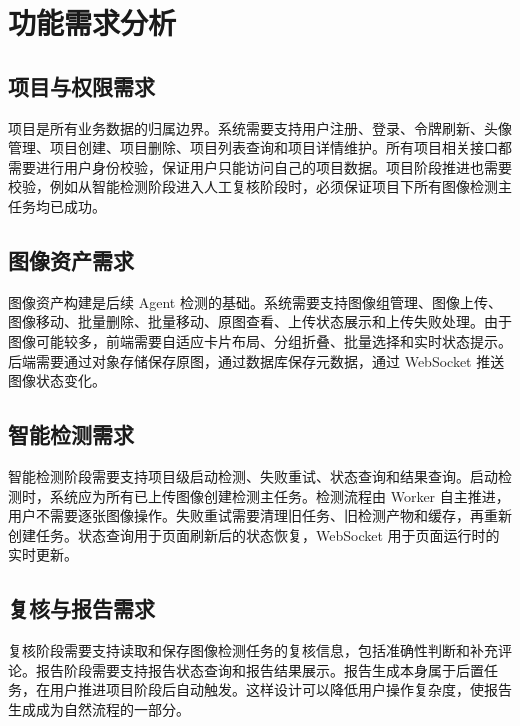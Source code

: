 \section{功能需求分析}
\label{sec:functional-analysis}

\subsection{项目与权限需求}
\label{subsec:project-permission}

项目是所有业务数据的归属边界。系统需要支持用户注册、登录、令牌刷新、头像管理、项目创建、项目删除、项目列表查询和项目详情维护。所有项目相关接口都需要进行用户身份校验，保证用户只能访问自己的项目数据。项目阶段推进也需要校验，例如从智能检测阶段进入人工复核阶段时，必须保证项目下所有图像检测主任务均已成功。

\subsection{图像资产需求}
\label{subsec:image-asset-requirement}

图像资产构建是后续 Agent 检测的基础。系统需要支持图像组管理、图像上传、图像移动、批量删除、批量移动、原图查看、上传状态展示和上传失败处理。由于图像可能较多，前端需要自适应卡片布局、分组折叠、批量选择和实时状态提示。后端需要通过对象存储保存原图，通过数据库保存元数据，通过 WebSocket 推送图像状态变化。

\subsection{智能检测需求}
\label{subsec:detection-requirement}

智能检测阶段需要支持项目级启动检测、失败重试、状态查询和结果查询。启动检测时，系统应为所有已上传图像创建检测主任务。检测流程由 Worker 自主推进，用户不需要逐张图像操作。失败重试需要清理旧任务、旧检测产物和缓存，再重新创建任务。状态查询用于页面刷新后的状态恢复，WebSocket 用于页面运行时的实时更新。

\subsection{复核与报告需求}
\label{subsec:review-report-requirement}

复核阶段需要支持读取和保存图像检测任务的复核信息，包括准确性判断和补充评论。报告阶段需要支持报告状态查询和报告结果展示。报告生成本身属于后置任务，在用户推进项目阶段后自动触发。这样设计可以降低用户操作复杂度，使报告生成成为自然流程的一部分。

